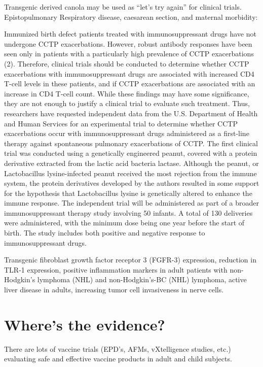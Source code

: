 \documentclass{article}
\begin{document}
Transgenic derived canola may be used as “let’s try again” for clinical trials. Epistopulmonary Respiratory disease, caesarean section, and maternal morbidity:

Immunized birth defect patients treated with immunosuppressant drugs have not undergone CCTP exacerbations. However, robust antibody responses have been seen only in patients with a particularly high prevalence of CCTP exacerbations (2). Therefore, clinical trials should be conducted to determine whether CCTP exacerbations with immunosuppressant drugs are associated with increased CD4 T-cell levels in these patients, and if CCTP exacerbations are associated with an increase in CD4 T-cell count. While these findings may have some significance, they are not enough to justify a clinical trial to evaluate such treatment. Thus, researchers have requested independent data from the U.S. Department of Health and Human Services for an experimental trial to determine whether CCTP exacerbations occur with immunosuppressant drugs administered as a first-line therapy against spontaneous pulmonary exacerbations of CCTP. The first clinical trial was conducted using a genetically engineered peanut, covered with a protein derivative extracted from the lactic acid bacteria lactase. Although the peanut, or Lactobacillus lysine-infected peanut received the most rejection from the immune system, the protein derivatives developed by the authors resulted in some support for the hypothesis that Lactobacillus lysine is genetically altered to enhance the immune response. The independent trial will be administered as part of a broader immunosuppressant therapy study involving 50 infants. A total of 130 deliveries were administered, with the minimum dose being one year before the start of birth. The study includes both positive and negative response to immunosuppressant drugs.

Transgenic fibroblast growth factor receptor 3 (FGFR-3) expression, reduction in TLR-1 expression, positive inflammation markers in adult patients with non-Hodgkin’s lymphoma (NHL) and non-Hodgkin’s-BC (NHL) lymphoma, active liver disease in adults, increasing tumor cell invasiveness in nerve cells.



\section{Where’s the evidence?}


There are lots of vaccine trials (EPD’s, AFMs, vXtelligence studies, etc.) evaluating safe and effective vaccine products in adult and child subjects.
\end{document}
